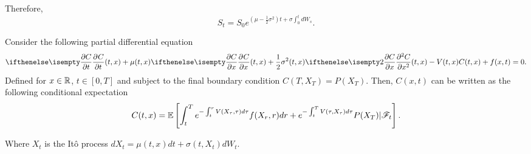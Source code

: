 \documentclass[../TGMAFFIRO.tex]{subfiles}
\begin{document}
Therefore,
\begin{equation}
  S_t = S_0e^{\left(\mu - \frac{1}{2}\sigma^2\right) t + \sigma\int_0^t dW_s}.
\end{equation}

\begin{theorem}
	Consider the following partial differential equation
	\begin{equation}
		\partialwrt{C}{t}{(t,x)}	 + \mu(t, x)\partialwrt{C}{x}{(t,x)} + \frac{1}{2}\sigma^2(t,x)\partialwrt[2]{C}{x}{(t,x)}  - V(t,x)C(t,x) + f(x,t) = 0 \label{eq:feynman_kac_pde}.
	\end{equation}
	Defined for $x\in\mathbb{R}$, $t\in[0,T]$ and subject to the final boundary condition $C(T, X_T) = P(X_T)$. Then, $C(x,t)$ can be written as the following conditional expectation
	\begin{equation}
	C(t, x) = \mathbb{E}\left[\int_t^Te^{-\int_t^r V(X_\tau, \tau) d\tau} f(X_r, r) dr + e^{-\int_t^TV(\tau, X_\tau) d\tau} P(X_T)| \mathscr{F}_t\right].
	\end{equation}

Where $X_t$ is the It\^o process $dX_t = \mu(t,x) dt + \sigma(t, X_t) dW_t$.
\end{theorem}
\end{document}
